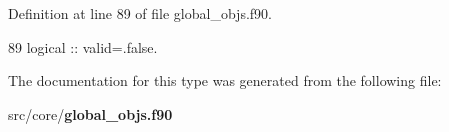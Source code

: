 Definition at line 89 of file global\+\_\+objs.\+f90.


\begin{DoxyCode}
89     \textcolor{keywordtype}{logical} :: valid=.false.
\end{DoxyCode}


The documentation for this type was generated from the following file\+:\begin{DoxyCompactItemize}
\item 
src/core/{\bf global\+\_\+objs.\+f90}\end{DoxyCompactItemize}
